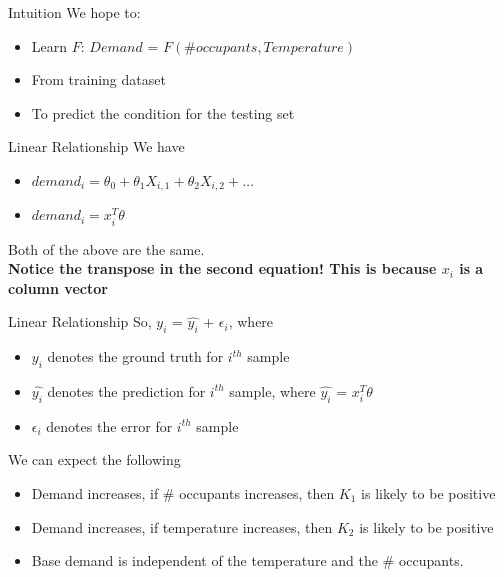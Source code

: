 \documentclass{beamer}
\begin{document}
\begin{frame}{Intuition}
    We hope to: 
    \begin{itemize}
        \item Learn $F$: $Demand$ = $F(\# occupants, Temperature)$
        \item From training dataset
        \item To predict the condition for the testing set
    \end{itemize}
\end{frame}


\begin{frame}{Linear Relationship}
    We have 
    \begin{itemize}
        \item $demand_{i} = \theta_{0} + \theta_{1} X_{i,1} + \theta_{2} X_{i,2} + \dots$
        \item $demand_{i} = x_{i}^{T} \theta$
    \end{itemize}
    Both of the above are the same.\\
    \textbf{Notice the transpose in the second equation! This is because $x_{i}$ is a column vector} 
\end{frame}


\begin{frame}{Linear Relationship}
    So, $y_{i}$ = $\hat{y_{i}}$ + $\epsilon_{i}$, where
    \begin{itemize}
        \item $y_{i}$ denotes the ground truth for $i^{th}$ sample
        \item $\hat{y_{i}}$ denotes the prediction for $i^{th}$ sample, where $\hat{y_{i}}$ = $x_{i}^{T} \theta$
        \item $\epsilon_{i}$ denotes the error for $i^{th}$ sample
    \end{itemize}
\end{frame}



\begin{frame}{We can expect the following}
    \begin{itemize}
        \item<+-> Demand increases, if \# occupants increases, then $K_{1}$ is likely to be positive
        
        \item<+-> Demand increases, if temperature increases, then $K_{2}$ is likely to be positive
        
        \item<+-> Base demand is independent of the temperature and the \# occupants.
        
    \end{itemize}
\end{frame}
\end{document}
